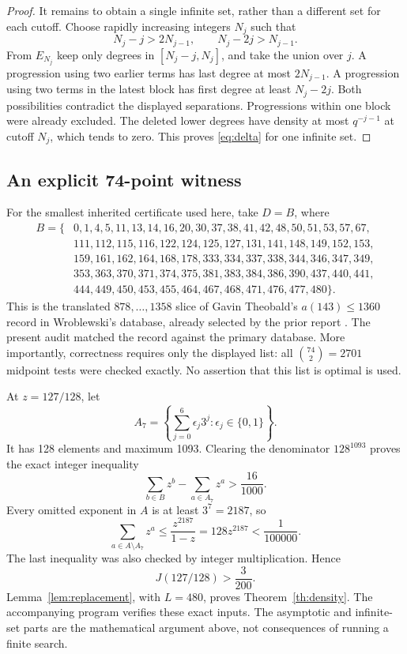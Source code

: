 \begin{proof}
It remains to obtain a single infinite set, rather than a different set
for each cutoff. Choose rapidly increasing integers \(N_j\) such that
\[
 N_j-j>2N_{j-1},\qquad N_j-2j>N_{j-1}.
\]
From \(E_{N_j}\) keep only degrees in \([N_j-j,N_j]\), and take the
union over \(j\). A progression using two earlier terms has last degree
at most \(2N_{j-1}\). A progression using two terms in the latest block
has first degree at least \(N_j-2j\). Both possibilities contradict
the displayed separations. Progressions within one block were already
excluded. The deleted lower degrees have density at most \(q^{-j-1}\)
at cutoff \(N_j\), which tends to zero. This proves \eqref{eq:delta}
for one infinite set.
\end{proof}

\subsection{An explicit 74-point witness}

For the smallest inherited certificate used here, take \(D=B\), where
\[
\begin{split}
B=\{&
0,1,4,5,11,13,14,16,20,30,37,38,41,42,48,50,51,53,57,67,\\
&111,112,115,116,122,124,125,127,131,141,148,149,152,153,\\
&159,161,162,164,168,178,333,334,337,338,344,346,347,349,\\
&353,363,370,371,374,375,381,383,384,386,390,437,440,441,\\
&444,449,450,453,455,464,467,468,471,476,477,480\}.
\end{split}
\]
This is the translated \(878,\ldots,1358\) slice of Gavin Theobald's
\(a(143)\le1360\) record in Wroblewski's database, already selected by the
prior report \cite{wroblewski,priorDensity}. The present audit matched the
record against the primary database. More importantly, correctness
requires only the displayed list: all \(\binom{74}{2}=2701\) midpoint
tests were checked exactly. No assertion that this list is optimal is
used.

At \(z=127/128\), let
\[
 A_7=\left\{\sum_{j=0}^{6}\epsilon_j3^j:\epsilon_j\in\{0,1\}\right\}.
\]
It has 128 elements and maximum 1093. Clearing the denominator \(128^{1093}\)
proves the exact integer inequality
\begin{equation}\label{eq:finitegain}
 \sum_{b\in B}z^b-\sum_{a\in A_7}z^a>\frac{16}{1000}.
\end{equation}
Every omitted exponent in \(A\) is at least \(3^7=2187\), so
\[
 \sum_{a\in A\setminus A_7}z^a
 \le \frac{z^{2187}}{1-z}
 =128z^{2187}<\frac1{100000}.
\]
The last inequality was also checked by integer multiplication. Hence
\begin{equation}\label{eq:Jpositive}
 J(127/128)>\frac{3}{200}.
\end{equation}
Lemma~\ref{lem:replacement}, with \(L=480\), proves
Theorem~\ref{th:density}. The accompanying program
 verifies these exact inputs.
The asymptotic and infinite-set parts are the mathematical argument
above, not consequences of running a finite search.


